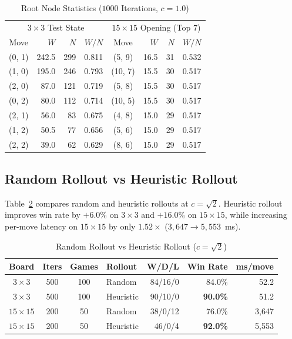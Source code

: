 \documentclass[conference]{IEEEtran}
\begin{document}
\begin{table}[t]
\centering
\caption{Root Node Statistics ($1000$ Iterations, $c = 1.0$)}
\label{tab:root_stats}
\begin{tabular}{@{}crrr|crrr@{}}
\toprule
\multicolumn{4}{c|}{$3\times 3$ Test State} & \multicolumn{4}{c}{$15\times 15$ Opening (Top 7)} \\
Move & $W$ & $N$ & $W/N$ & Move & $W$ & $N$ & $W/N$ \\
\midrule
(0, 1) & 242.5 & 299 & 0.811 & (5, 9) & 16.5 & 31 & 0.532 \\
(1, 0) & 195.0 & 246 & 0.793 & (10, 7) & 15.5 & 30 & 0.517 \\
(2, 0) & 87.0 & 121 & 0.719 & (5, 8) & 15.5 & 30 & 0.517 \\
(0, 2) & 80.0 & 112 & 0.714 & (10, 5) & 15.5 & 30 & 0.517 \\
(2, 1) & 56.0 & 83 & 0.675 & (4, 8) & 15.0 & 29 & 0.517 \\
(1, 2) & 50.5 & 77 & 0.656 & (5, 6) & 15.0 & 29 & 0.517 \\
(2, 2) & 39.0 & 62 & 0.629 & (8, 6) & 15.0 & 29 & 0.517 \\
\bottomrule
\end{tabular}
\end{table}

\subsection{Random Rollout vs Heuristic Rollout}
Table~\ref{tab:rollout} compares random and heuristic rollouts at $c = \sqrt{2}$. Heuristic rollout improves win rate by $+6.0\%$ on $3\times 3$ and $+16.0\%$ on $15\times 15$, while increasing per-move latency on $15\times 15$ by only $1.52\times$ ($3{,}647 \rightarrow 5{,}553$~ms).

\begin{table}[t]
\centering
\caption{Random Rollout vs Heuristic Rollout ($c = \sqrt{2}$)}
\label{tab:rollout}
\setlength{\tabcolsep}{4pt}
\begin{tabular}{@{}ccclrrr@{}}
\toprule
Board & Iters & Games & Rollout & W/D/L & Win Rate & ms/move \\
\midrule
$3\times 3$ & 500 & 100 & Random & 84/16/0 & 84.0\% & 52.2 \\
$3\times 3$ & 500 & 100 & Heuristic & 90/10/0 & \textbf{90.0\%} & 51.2 \\
\midrule
$15\times 15$ & 200 & 50 & Random & 38/0/12 & 76.0\% & 3,647 \\
$15\times 15$ & 200 & 50 & Heuristic & 46/0/4 & \textbf{92.0\%} & 5,553 \\
\bottomrule
\end{tabular}
\end{table}
\end{document}
